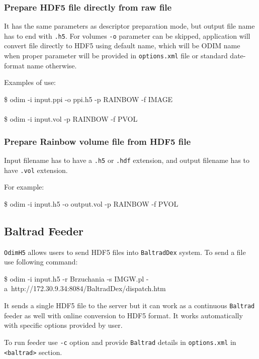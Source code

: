 \documentclass[11p]{article}
\begin{document}
\subsubsection*{Prepare HDF5 file directly from raw file}

It has the same parameters as descriptor preparation mode, but output file name
has to end with \texttt{.h5}. For volumes \texttt{-o} parameter can be skipped,
application will convert file directly to HDF5 using default name, which will be
ODIM name when proper parameter will be provided in \texttt{options.xml} file or
standard date-format name otherwise.

Examples of use:
\begin{kod}
\$ odim -i input.ppi -o ppi.h5 -p RAINBOW -f IMAGE\\ \\
\$ odim -i input.vol -p RAINBOW -f PVOL
\end{kod}

\subsubsection*{Prepare Rainbow volume file from HDF5 file}

Input filename has to have a \texttt{.h5} or \texttt{.hdf} extension, and output
filename has to have \texttt{.vol} extension.

For example:
\begin{kod}
\$ odim -i input.h5 -o output.vol -p RAINBOW -f PVOL

\end{kod}

\subsection{Baltrad Feeder}

\texttt{OdimH5} allows users to send HDF5 files into \texttt{BaltradDex} system.
To send a file use following command:
\begin{kod}
\$ odim -i input.h5 -r Brzuchania -s IMGW.pl
-a~http://172.30.9.34:8084/BaltradDex/dispatch.htm
\end{kod}

It sends a single HDF5 file to the server but it can work as a continuous
\texttt{Baltrad} feeder as well with online conversion to HDF5 format. It works
automatically with specific options provided by user.

To run feeder use \texttt{-c} option and provide \texttt{Baltrad} details in
\texttt{options.xml} in \texttt{<baltrad>} section.
\end{document}
